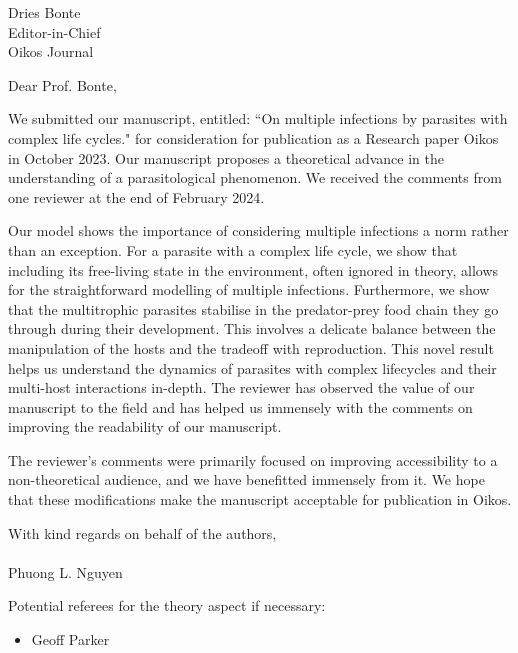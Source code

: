 \documentclass[10,DIN, pagenumber=false, parskip=half,fromalign=right, fromphone=false,fromemail=true, fromurl=false,fromlogo=true, fromrule=false]{scrlttr2}
\begin{document}
\sffamily

\begin{letter}{
\sffamily
\vspace{-0.4cm}
Dries Bonte \\
Editor-in-Chief\\
Oikos Journal
}
\opening{\sffamily \vspace{-1cm} Dear Prof. Bonte,}
\vspace{-0.3cm}

We submitted our manuscript, entitled: ``On multiple infections by parasites with complex life cycles." for consideration for publication as a Research paper Oikos in October 2023.
Our manuscript proposes a theoretical advance in the understanding of a parasitological phenomenon.
We received the comments from one reviewer at the end of February 2024.

Our model shows the importance of considering multiple infections a norm rather than an exception. 
For a parasite with a complex life cycle, we show that including its free-living state in the environment, often ignored in theory, allows for the straightforward modelling of multiple infections.
Furthermore, we show that the multitrophic parasites stabilise in the predator-prey food chain they go through during their development.
This involves a delicate balance between the manipulation of the hosts and the tradeoff with reproduction.
This novel result helps us understand the dynamics of parasites with complex lifecycles and their multi-host interactions in-depth. 
The reviewer has observed the value of our manuscript to the field and has helped us immensely with the comments on improving the readability of our manuscript.

The reviewer's comments were primarily focused on improving accessibility to a non-theoretical audience, and we have benefitted immensely from it.
We hope that these modifications make the manuscript acceptable for publication in Oikos.

With kind regards on behalf of the authors,\\
\\
Phuong L. Nguyen


Potential referees for the theory aspect if necessary:

\begin{itemize}
	\item Geoff Parker
\end{itemize}

\end{letter}
\end{document}
